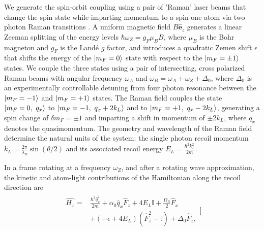 We generate the spin-orbit coupling using a pair of 'Raman' laser beams that change the spin state while imparting momentum to a spin-one atom via two photon Raman transitions \cite{lan_raman-dressed_2014,campbell_itinerant_2015}.  A uniform magnetic field $B\mathbf{\hat{e}}_z$ generates a linear Zeeman splitting of the energy levels $\hbar\omega_Z=g_F\mu_BB$, where $\mu_B$ is the Bohr magneton and $g_F$ is the Land\'e $g$ factor, and introduces a quadratic Zemen shift $\epsilon$ that shifts the energy of the $|m_F=0\rangle$ state with respect to the $|m_F=\pm1\rangle$ states. We couple the three states using a pair of intersecting, cross polarized Raman beams with angular frequency $\omega_A$ and $\omega_B=\omega_A+\omega_Z+\Delta_0$, where $\Delta_0$ is an experimentally controllable detuning from four photon resonance between the $|m_F=-1\rangle$ and $|m_F=+1\rangle$ states. The Raman field couples the state $|m_F=0,\ q_x\rangle$ to $|m_F=-1,\ q_x+2k_L\rangle$ and to $|m_F=+1,\ q_x-2k_L\rangle$, generating a spin change of $\delta m_F=\pm1$ and imparting a shift in momentum of $\pm 2k_L$, where $q_x$ denotes the quasimomentum. The geometry and wavelength of the Raman field determine the natural units of the system: the single photon recoil momentum $k_L=\frac{2\pi}{\lambda_R}\sin(\theta/2)$ and its associated recoil energy $E_L=\frac{\hbar^2k_L^2}{2m}$.


In a frame rotating at a frequency $\omega_Z$, and after a rotating wave approximation, the kinetic and atom-light contributions of the Hamiltonian along the recoil direction are
\begin{align}
\begin{split}
\hat{H_x} = &\frac{\hbar^2\hat{q}_x^2}{2m} + \alpha_0\hat{q}_x\hat{F}_z +4E_L\mathbb{I} + \frac{\Omega_R}{2}\hat{F}_x\\
& +(-\epsilon+4E_L)(\hat{F}_z^2-\mathbb{I}) +\Delta_0\hat{F}_z, 
\label{Eq:SOCone}
\end{split}]
\end{align}	

